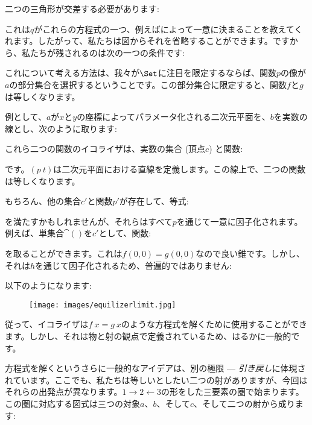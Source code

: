 \noindent
二つの三角形が交差する必要があります: 


これは$q$がこれらの方程式の一つ、例えばによって一意に決まることを教えてくれます。したがって、私たちは図からそれを省略することができます。ですから、私たちが残されるのは次の一つの条件です: 


これについて考える方法は、我々が$\Set$に注目を限定するならば、関数$p$の像が$a$の部分集合を選択するということです。この部分集合に限定すると、関数$f$と$g$は等しくなります。

例として、$a$が$x$と$y$の座標によってパラメータ化される二次元平面を、$b$を実数の線とし、次のように取ります: 


これら二つの関数のイコライザは、実数の集合 (頂点$c$) と関数: 


です。$(p~t)$は二次元平面における直線を定義します。この線上で、二つの関数は等しくなります。

もちろん、他の集合$c'$と関数$p'$が存在して、等式: 


を満たすかもしれませんが、それらはすべて$p$を通じて一意に因子化されます。例えば、単集合$\cat{()}$を$c'$として、関数: 


を取ることができます。これは$f (0, 0) = g (0, 0)$なので良い錐です。しかし、それは$h$を通じて因子化されるため、普遍的ではありません: 


以下のようになります: 


\begin{figure}[H]
  \centering
  \texttt{[image: images/equilizerlimit.jpg]}
\end{figure}

\noindent
従って、イコライザは$f~x = g~x$のような方程式を解くために使用することができます。しかし、それは物と射の観点で定義されているため、はるかに一般的です。

方程式を解くというさらに一般的なアイデアは、別の極限 --- \emph{引き戻し}に体現されています。ここでも、私たちは等しいとしたい二つの射がありますが、今回はそれらの出発点が異なります。$1\rightarrow2\leftarrow3$の形をした三要素の圏で始まります。この圏に対応する図式は三つの対象$a$、$b$、そして$c$、そして二つの射から成ります: 

